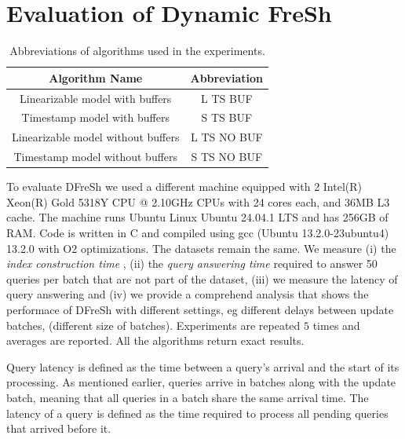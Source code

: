 \clearpage

\section{Evaluation of Dynamic FreSh}

\begin{table}[htbp]
    \centering
    \renewcommand{\arraystretch}{1.2} 
    \begin{tabular}{||c | c ||} 
        \hline
        \textbf{Algorithm Name} & \textbf{Abbreviation} \\ 
        \hline
        Linearizable model with buffers & L TS BUF \\ 
        \hline
    	Timestamp model with buffers & S TS BUF \\ 
        \hline
        Linearizable model without buffers & L TS NO BUF \\ 
        \hline
        Timestamp model without buffers & S TS NO BUF \\ 
        \hline
    \end{tabular}
    \caption{Abbreviations of algorithms used in the experiments.}
    \label{table:algorithms:abbreviation}
\end{table}



To evaluate DFreSh we used a different machine equipped with 
2 Intel(R) Xeon(R) Gold 5318Y CPU @ 2.10GHz
CPUs with 24 cores each, and 36MB L3 cache. The machine runs
Ubuntu Linux Ubuntu 24.04.1 LTS and has 256GB of RAM. Code is written in 
C and compiled using gcc (Ubuntu 13.2.0-23ubuntu4) 13.2.0 with O2 optimizations.
 The datasets remain the same.
We measure (i) the {\em index construction time} , 
(ii) the {\em query answering time} required to answer 50 queries per batch that are not
part of the dataset, 
(iii) we measure the latency of query answering and 
(iv) we provide a comprehend analysis that shows the performace of DFreSh with 
different settings, eg different delays between update batches, (different size of batches). 
Experiments are repeated $5$ times and averages are reported. All the algorithms
return exact results.

% 
Query latency is defined as the time between a query's arrival and the start of 
its processing.
% 
As mentioned earlier, queries arrive in batches along with the update batch, meaning 
that all queries in a batch share the same arrival time. The latency of a query is 
defined as the time required to process all pending queries that arrived before it.

